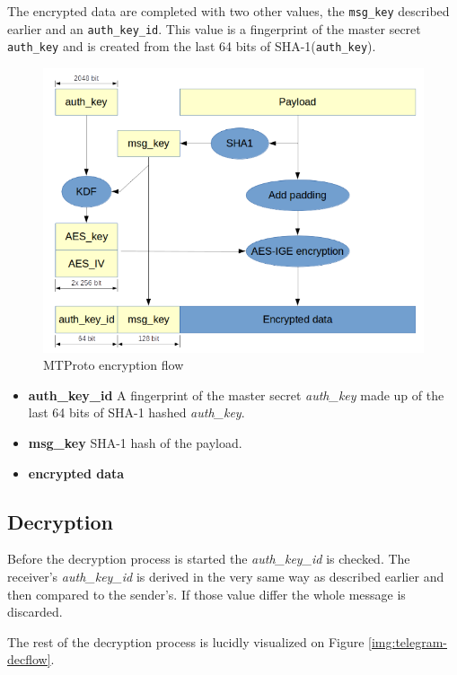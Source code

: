 \documentclass[thesis=M,english]{FITthesis}[2012/10/20]
\begin{document}
The encrypted data are completed with two other values, the \texttt{msg\_key} described earlier and an \texttt{auth\_key\_id}. This value is a fingerprint of the master secret \texttt{auth\_key} and is created from the last 64 bits of SHA-1(\texttt{auth\_key}).

\begin{figure}[htb]
	\centering
	\includegraphics[width=1\textwidth]{telegram-encflow-ed.png}
	\caption{MTProto encryption flow \cite{telegram-aarhus}}
	\label{img:telegram-encflow}
\end{figure}

\begin{itemize}
	\item  \textbf{auth\_key\_id} A fingerprint of the master secret \emph{auth\_key} made up of the last 64 bits of SHA-1 hashed \emph{auth\_key}.
	\item  \textbf{msg\_key} SHA-1 hash of the payload.
	\item  \textbf{encrypted data}
\end{itemize}


\subsection{Decryption}

Before the decryption process is started the \emph{auth\_key\_id} is checked. The receiver's \emph{auth\_key\_id} is derived in the very same way as described earlier and then compared to the sender's. If those value differ the whole message is discarded.

The rest of the decryption process is lucidly visualized on Figure \ref{img:telegram-decflow}.
\end{document}

